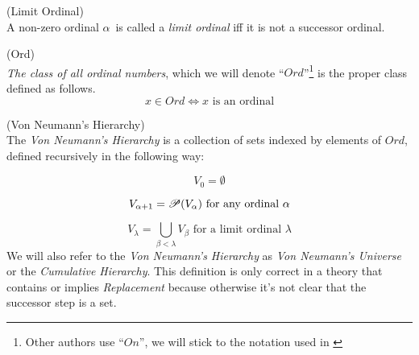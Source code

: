 \begin{definition}{(Limit Ordinal)}\label{def:limit_ordinal}\\ %
A non-zero ordinal $\alpha$ is called a \emph{limit ordinal} iff it is not a successor ordinal.
\end{definition}

\begin{definition}{(Ord)}\label{def:ord}\\  %
\emph{The class of all ordinal numbers}, which we will denote ``$Ord$''\footnote{Other authors use ``$On$'', we will stick to the notation used in \cite{JechBook}} is the proper class defined as follows.
\begin{equation}
x \in Ord \iff x\mbox{ is an ordinal}
\end{equation}
\end{definition}


\begin{definition}{(Von Neumann's Hierarchy)}\label{def:von_neumann}\\ %
The \emph{Von Neumann's Hierarchy} is a collection of sets indexed by elements of $Ord$, defined recursively in the following way:
\bce[(i)]
\item 
\begin{equation}
V_0 = \emptyset
\end{equation}
\item 
\begin{equation}
V_{\alpha+1} = \mathscr{P} (V_\alpha)\mbox{ for any ordinal $\alpha$}
\end{equation}
\item
\begin{equation} 
V_\lambda = \bigcup_{\beta < \lambda} V_\beta \mbox{ for a limit ordinal $\lambda$}
\end{equation}
\ece
We will also refer to the \emph{Von Neumann's Hierarchy} as \emph{Von Neumann's Universe} or the \emph{Cumulative Hierarchy}. %
This definition is only correct in a theory that contains or implies \emph{Replacement} because otherwise it's not clear that the successor step is a set. 
\end{definition}

